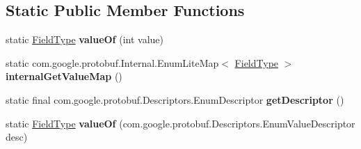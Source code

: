 \subsection*{Static Public Member Functions}
\begin{DoxyCompactItemize}
\item 
\mbox{\label{enumcom_1_1mysql_1_1cj_1_1x_1_1protobuf_1_1_mysqlx_resultset_1_1_column_meta_data_1_1_field_type_acadb44789bcba3de3d78eee3402b7de9}} 
static \mbox{\hyperlink{enumcom_1_1mysql_1_1cj_1_1x_1_1protobuf_1_1_mysqlx_resultset_1_1_column_meta_data_1_1_field_type}{Field\+Type}} {\bfseries value\+Of} (int value)
\item 
\mbox{\label{enumcom_1_1mysql_1_1cj_1_1x_1_1protobuf_1_1_mysqlx_resultset_1_1_column_meta_data_1_1_field_type_aad12eb65faefdf3d9a306a54450aab70}} 
static com.\+google.\+protobuf.\+Internal.\+Enum\+Lite\+Map$<$ \mbox{\hyperlink{enumcom_1_1mysql_1_1cj_1_1x_1_1protobuf_1_1_mysqlx_resultset_1_1_column_meta_data_1_1_field_type}{Field\+Type}} $>$ {\bfseries internal\+Get\+Value\+Map} ()
\item 
\mbox{\label{enumcom_1_1mysql_1_1cj_1_1x_1_1protobuf_1_1_mysqlx_resultset_1_1_column_meta_data_1_1_field_type_adb82dc481c0cb2f8987a18b0618b610b}} 
static final com.\+google.\+protobuf.\+Descriptors.\+Enum\+Descriptor {\bfseries get\+Descriptor} ()
\item 
\mbox{\label{enumcom_1_1mysql_1_1cj_1_1x_1_1protobuf_1_1_mysqlx_resultset_1_1_column_meta_data_1_1_field_type_ada318b207cf853a321d68c51c47f6936}} 
static \mbox{\hyperlink{enumcom_1_1mysql_1_1cj_1_1x_1_1protobuf_1_1_mysqlx_resultset_1_1_column_meta_data_1_1_field_type}{Field\+Type}} {\bfseries value\+Of} (com.\+google.\+protobuf.\+Descriptors.\+Enum\+Value\+Descriptor desc)
\end{DoxyCompactItemize}
